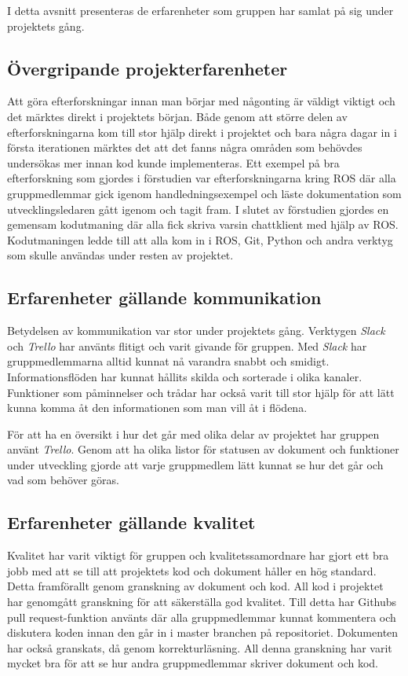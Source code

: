 I detta avsnitt presenteras de erfarenheter som gruppen har samlat på sig under projektets gång.

\subsection{Övergripande projekterfarenheter}

Att göra efterforskningar innan man börjar med någonting är väldigt viktigt och det märktes direkt i projektets början. Både genom att större delen av efterforskningarna kom till stor hjälp direkt i projektet och bara några dagar in i första iterationen märktes det att det fanns några områden som behövdes undersökas mer innan kod kunde implementeras. Ett exempel på bra efterforskning som gjordes i förstudien var efterforskningarna kring ROS där alla gruppmedlemmar gick igenom handledningsexempel och läste dokumentation som utvecklingsledaren gått igenom och tagit fram. I slutet av förstudien gjordes en gemensam kodutmaning där alla fick skriva varsin chattklient med hjälp av ROS. Kodutmaningen ledde till att alla kom in i ROS, Git, Python och andra verktyg som skulle användas under resten av projektet.


\subsection{Erfarenheter gällande kommunikation}

Betydelsen av kommunikation var stor under projektets gång. Verktygen \textit{Slack} och \textit{Trello} har använts flitigt och varit givande för gruppen. Med \textit{Slack} har gruppmedlemmarna alltid kunnat nå varandra snabbt och smidigt. Informationsflöden har kunnat hållits skilda och sorterade i olika kanaler. Funktioner som påminnelser och trådar har också varit till stor hjälp för att lätt kunna komma åt den informationen som man vill åt i flödena.

För att ha en översikt i hur det går med olika delar av projektet har gruppen använt \textit{Trello}. Genom att ha olika listor för statusen av dokument och funktioner under utveckling gjorde att varje gruppmedlem lätt kunnat se hur det går och vad som behöver göras.


\subsection{Erfarenheter gällande kvalitet}

Kvalitet har varit viktigt för gruppen och kvalitetssamordnare  har gjort ett bra jobb med att se till att projektets kod och dokument håller en hög standard. Detta framförallt genom granskning av dokument och kod. All kod i projektet har genomgått granskning för att säkerställa god kvalitet. Till detta har Githubs pull request-funktion använts där alla gruppmedlemmar kunnat kommentera och diskutera koden innan den går in i master branchen på repositoriet. Dokumenten har också granskats, då genom korrekturläsning. All denna granskning har varit mycket bra för att se hur andra gruppmedlemmar skriver dokument och kod.


